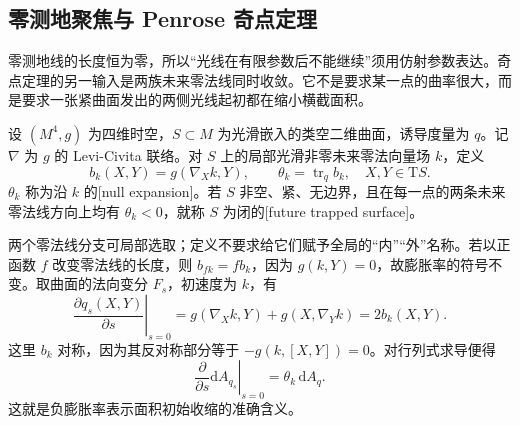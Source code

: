 \subsection{零测地聚焦与 Penrose 奇点定理}
\label{g3:subsec:A02:04}

零测地线的长度恒为零，所以“光线在有限参数后不能继续”须用仿射参数表达。奇点定理的另一输入是两族未来零法线同时收敛。它不是要求某一点的曲率很大，而是要求一张紧曲面发出的两侧光线起初都在缩小横截面积。

\begin{definition}\label{g3:def:A-trapped-surface}
	设 \((M^4,g)\) 为四维时空，\(S\subset M\) 为光滑嵌入的类空二维曲面，诱导度量为 \(q\)。记 \(\nabla\) 为 \(g\) 的 Levi-Civita 联络。对 \(S\) 上的局部光滑非零未来零法向量场 \(k\)，定义
	\begin{equation}\label{g3:eq:A-null-expansion}
		b_k(X,Y)=g(\nabla_Xk,Y),
		\qquad \theta_k=\operatorname{tr}_q b_k,
		\quad X,Y\in\mathrm TS.
	\end{equation}
	\(\theta_k\) 称为沿 \(k\) 的[null expansion]。若 \(S\) 非空、紧、无边界，且在每一点的两条未来零法线方向上均有 \(\theta_k<0\)，就称 \(S\) 为闭的[future trapped surface]。
\end{definition}

两个零法线分支可局部选取；定义不要求给它们赋予全局的“内”“外”名称。若以正函数 \(f\) 改变零法线的长度，则
\(b_{fk}=fb_k\)，因为 \(g(k,Y)=0\)，故膨胀率的符号不变。取曲面的法向变分 \(F_s\)，初速度为 \(k\)，有
\[
	\left.\frac{\partial q_s(X,Y)}{\partial s}\right|_{s=0}
	=g(\nabla_Xk,Y)+g(X,\nabla_Yk)=2b_k(X,Y).
\]
这里 \(b_k\) 对称，因为其反对称部分等于 \(-g(k,[X,Y])=0\)。对行列式求导便得
\begin{equation}\label{g3:eq:A-expansion-area-variation}
	\left.\frac{\partial}{\partial s}\mathrm dA_{q_s}\right|_{s=0}
	=\theta_k\,\mathrm dA_q.
\end{equation}
这就是负膨胀率表示面积初始收缩的准确含义。

